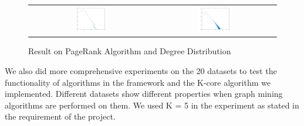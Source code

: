 \begin{figure}[H]
\begin{center}
\begin{tabular}{cc}
     \includegraphics[width=0.3\textwidth]{FIG/10pagerank.png} &
     \includegraphics[width=0.3\textwidth]{FIG/10degreedist.png} \\
\end{tabular}
\caption{Result on PageRank Algorithm and Degree Distribution}
\end{center}
\end{figure}


We also did more comprehensive experiments on the 20 datasets to test the functionality of algorithms in the framework and the K-core algorithm we implemented.
Different datasets show different properties when graph mining algorithms are performed on them. We used K = 5 in the experiment as stated in the requirement of the project.

